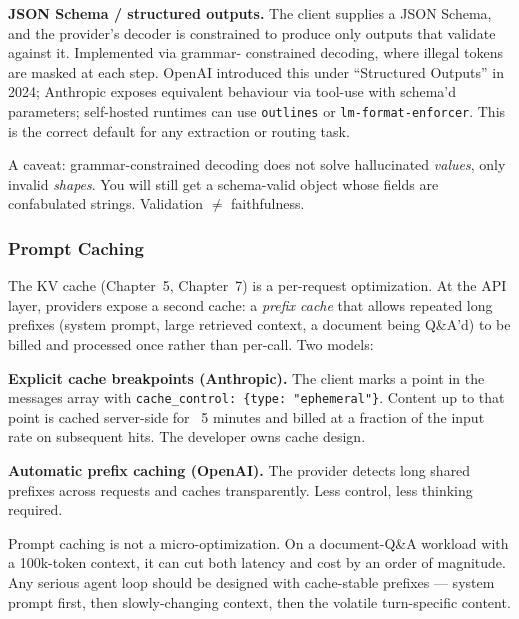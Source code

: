 \textbf{JSON Schema / structured outputs.} The client supplies a
JSON Schema, and the provider's decoder is constrained to produce
only outputs that validate against it. Implemented via grammar-
constrained decoding, where illegal tokens are masked at each
step. OpenAI introduced this under ``Structured Outputs'' in
2024; Anthropic exposes equivalent behaviour via tool-use with
schema'd parameters; self-hosted runtimes can use \texttt{outlines}
or \texttt{lm-format-enforcer}. This is the correct default for
any extraction or routing task.

A caveat: grammar-constrained decoding does not solve
hallucinated \emph{values}, only invalid \emph{shapes}. You will
still get a schema-valid object whose fields are confabulated
strings. Validation $\neq$ faithfulness.

\subsubsection{Prompt Caching}

The KV cache (Chapter~5, Chapter~7) is a per-request optimization. At
the API layer, providers expose a second cache: a \emph{prefix
cache} that allows repeated long prefixes (system prompt, large
retrieved context, a document being Q\&A'd) to be billed and
processed once rather than per-call. Two models:

\textbf{Explicit cache breakpoints (Anthropic).} The client marks
a point in the messages array with \texttt{cache\_control:
\{type: "ephemeral"\}}. Content up to that point is cached
server-side for ~5 minutes and billed at a fraction of the input
rate on subsequent hits. The developer owns cache design.

\textbf{Automatic prefix caching (OpenAI).} The provider detects
long shared prefixes across requests and caches transparently.
Less control, less thinking required.

Prompt caching is not a micro-optimization. On a document-Q\&A
workload with a 100k-token context, it can cut both latency and
cost by an order of magnitude. Any serious agent loop should be
designed with cache-stable prefixes --- system prompt first, then
slowly-changing context, then the volatile turn-specific content.

